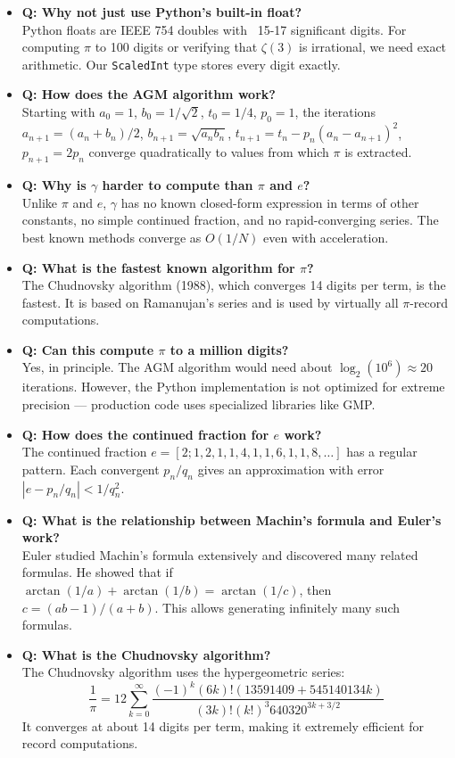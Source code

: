 \begin{itemize}
\item \textbf{Q: Why not just use Python's built-in float?} \\
Python floats are IEEE 754 doubles with ~15-17 significant digits. For computing $\pi$ to 100 digits or verifying that $\zeta(3)$ is irrational, we need exact arithmetic. Our \texttt{ScaledInt} type stores every digit exactly.

\item \textbf{Q: How does the AGM algorithm work?} \\
Starting with $a_0=1$, $b_0=1/\sqrt{2}$, $t_0=1/4$, $p_0=1$, the iterations
$a_{n+1}=(a_n+b_n)/2$, $b_{n+1}=\sqrt{a_nb_n}$, $t_{n+1}=t_n-p_n(a_n-a_{n+1})^2$,
$p_{n+1}=2p_n$ converge quadratically to values from which $\pi$ is extracted.

\item \textbf{Q: Why is $\gamma$ harder to compute than $\pi$ and $e$?} \\
Unlike $\pi$ and $e$, $\gamma$ has no known closed-form expression in terms of other constants, no simple continued fraction, and no rapid-converging series. The best known methods converge as $O(1/N)$ even with acceleration.

\item \textbf{Q: What is the fastest known algorithm for $\pi$?} \\
The Chudnovsky algorithm (1988), which converges 14 digits per term, is the fastest. It is based on Ramanujan's series and is used by virtually all $\pi$-record computations.

\item \textbf{Q: Can this compute $\pi$ to a million digits?} \\
Yes, in principle. The AGM algorithm would need about $\log_2(10^6) \approx 20$ iterations. However, the Python implementation is not optimized for extreme precision --- production code uses specialized libraries like GMP.

\item \textbf{Q: How does the continued fraction for $e$ work?} \\
The continued fraction $e = [2; 1, 2, 1, 1, 4, 1, 1, 6, 1, 1, 8, \ldots]$ has a regular pattern. Each convergent $p_n/q_n$ gives an approximation with error $|e - p_n/q_n| < 1/q_n^2$.

\item \textbf{Q: What is the relationship between Machin's formula and Euler's work?} \\
Euler studied Machin's formula extensively and discovered many related formulas. He showed that if $\arctan(1/a) + \arctan(1/b) = \arctan(1/c)$, then $c = (ab-1)/(a+b)$. This allows generating infinitely many such formulas.

\item \textbf{Q: What is the Chudnovsky algorithm?} \\
The Chudnovsky algorithm uses the hypergeometric series:
\[
\frac{1}{\pi} = 12 \sum_{k=0}^{\infty} \frac{(-1)^k (6k)! (13591409 + 545140134k)}{(3k)!(k!)^3 640320^{3k+3/2}}
\]
It converges at about 14 digits per term, making it extremely efficient for record computations.
\end{itemize}

